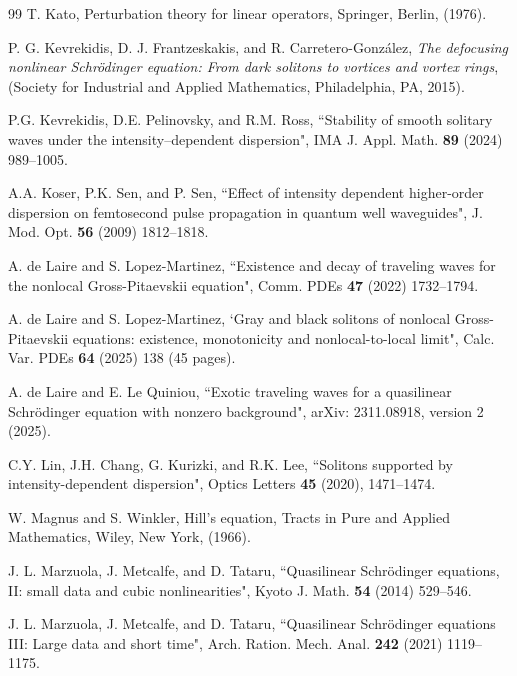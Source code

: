 \documentclass[12pt,reqno]{amsart}
\numberwithin{equation}{section}
\numberwithin{figure}{section}
\begin{document}
\begin{thebibliography}{99}
 T. Kato, Perturbation theory for linear operators, Springer, Berlin, (1976).
		
 P. G. Kevrekidis, D. J. Frantzeskakis, and R. Carretero-Gonz\'{a}lez, {\em The defocusing nonlinear Schr\"{o}dinger equation: From dark solitons to vortices and vortex rings}, (Society for Industrial and Applied Mathematics, Philadelphia, PA, 2015). 
		
  P.G. Kevrekidis, D.E. Pelinovsky, and R.M. Ross,
``Stability of smooth solitary waves under the intensity--dependent dispersion", 
IMA J. Appl. Math. {\bf 89} (2024) 989--1005.

 A.A. Koser, P.K. Sen, and P. Sen,
``Effect of intensity dependent higher-order dispersion on femtosecond pulse propagation in quantum well waveguides", J. Mod. Opt. {\bf 56} (2009) 1812--1818.

 A. de Laire and S. Lopez-Martinez, ``Existence and decay of traveling waves for the nonlocal Gross-Pitaevskii equation", 
Comm. PDEs {\bf 47} (2022) 1732--1794.

 A. de Laire and S. Lopez-Martinez, `Gray and black solitons of nonlocal Gross-Pitaevskii equations: existence, monotonicity and nonlocal-to-local limit", Calc. Var. PDEs {\bf 64} (2025) 138 (45 pages).

 A. de Laire and  E. Le Quiniou, ``Exotic traveling waves for a quasilinear Schr\"{o}dinger equation with nonzero background", 
arXiv: 2311.08918, version 2 (2025).

	C.Y. Lin, J.H. Chang, G. Kurizki, and
R.K. Lee, ``Solitons supported by intensity-dependent dispersion",
Optics Letters {\bf 45} (2020), 1471--1474.
		
 W. Magnus and S. Winkler, Hill's equation,	Tracts in Pure and Applied Mathematics, Wiley, New York, (1966).

 J. L. Marzuola, J. Metcalfe, and D. Tataru, ``Quasilinear Schr\"{o}dinger equations, II: small data and cubic
nonlinearities", Kyoto J. Math. {\bf 54} (2014) 529--546.

 J. L. Marzuola, J. Metcalfe, and D. Tataru, 
``Quasilinear Schr\"{o}dinger equations III: Large data and short time", Arch. Ration. Mech. Anal. {\bf 242} (2021) 1119--1175.
		
		

\end{thebibliography}
\end{document}
